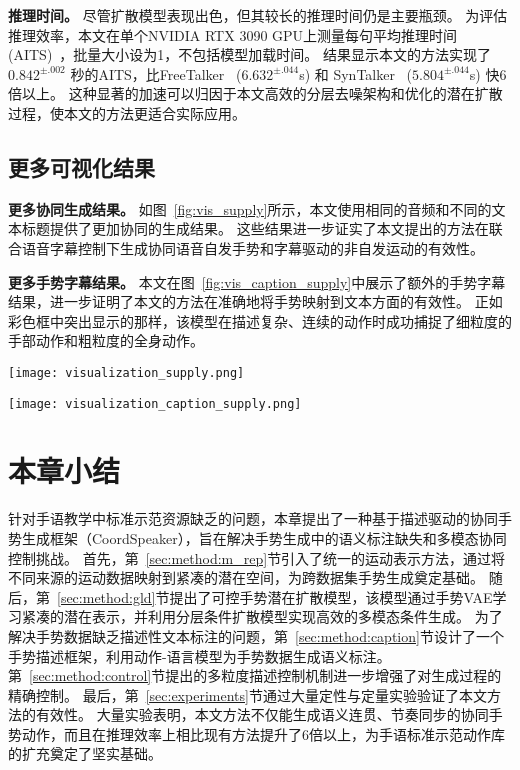 \textbf{推理时间。}
尽管扩散模型表现出色，但其较长的推理时间仍是主要瓶颈。
为评估推理效率，本文在单个NVIDIA RTX 3090 GPU上测量每句平均推理时间(AITS)~\cite{chen2023executing}，批量大小设为1，不包括模型加载时间。
结果显示本文的方法实现了 $0.842^{\pm .002}$ 秒的AITS，比FreeTalker~\cite{yang2024freetalker} ($6.632^{\pm .044}$s) 和 SynTalker~\cite{chen2024syntalker} ($5.804^{\pm .044}$s) 快6倍以上。
这种显著的加速可以归因于本文高效的分层去噪架构和优化的潜在扩散过程，使本文的方法更适合实际应用。

\subsection{更多可视化结果}
\textbf{更多协同生成结果。}
如图~\ref{fig:vis_supply}所示，本文使用相同的音频和不同的文本标题提供了更加协同的生成结果。
这些结果进一步证实了本文提出的方法在联合语音字幕控制下生成协同语音自发手势和字幕驱动的非自发运动的有效性。

\textbf{更多手势字幕结果。}
本文在图~\ref{fig:vis_caption_supply}中展示了额外的手势字幕结果，进一步证明了本文的方法在准确地将手势映射到文本方面的有效性。
正如彩色框中突出显示的那样，该模型在描述复杂、连续的动作时成功捕捉了细粒度的手部动作和粗粒度的全身动作。

\begin{figure*}[t]
  \centering
  \texttt{[image: visualization\_supply.png]}
  \caption{协同手势生成的更多视觉结果。}
  \label{fig:vis_supply}
\end{figure*}

\begin{figure*}[t]
  \centering
  \texttt{[image: visualization\_caption\_supply.png]}
  \caption{更多手势字幕结果。彩色框突出显示了手势和文本字幕之间的精确映射。}
  \label{fig:vis_caption_supply}
\end{figure*}


\section{本章小结}
针对手语教学中标准示范资源缺乏的问题，本章提出了一种基于描述驱动的协同手势生成框架（CoordSpeaker），旨在解决手势生成中的语义标注缺失和多模态协同控制挑战。
首先，第~\ref{sec:method:m_rep}节引入了统一的运动表示方法，通过将不同来源的运动数据映射到紧凑的潜在空间，为跨数据集手势生成奠定基础。
随后，第~\ref{sec:method:gld}节提出了可控手势潜在扩散模型，该模型通过手势VAE学习紧凑的潜在表示，并利用分层条件扩散模型实现高效的多模态条件生成。
为了解决手势数据缺乏描述性文本标注的问题，第~\ref{sec:method:caption}节设计了一个手势描述框架，利用动作-语言模型为手势数据生成语义标注。
第~\ref{sec:method:control}节提出的多粒度描述控制机制进一步增强了对生成过程的精确控制。
最后，第~\ref{sec:experiments}节通过大量定性与定量实验验证了本文方法的有效性。
大量实验表明，本文方法不仅能生成语义连贯、节奏同步的协同手势动作，而且在推理效率上相比现有方法提升了6倍以上，为手语标准示范动作库的扩充奠定了坚实基础。
